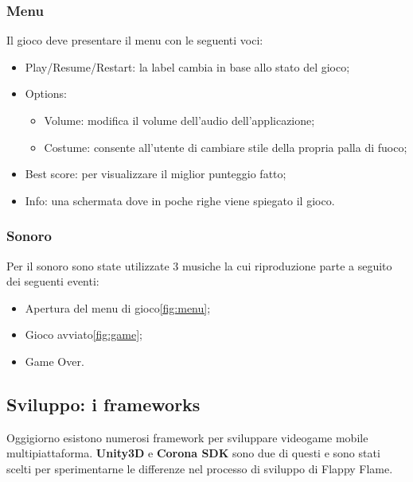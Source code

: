 		\subsubsection{Menu}
			Il gioco deve presentare il menu con le seguenti voci:
			\begin{itemize}
				\item Play/Resume/Restart: la label cambia in base allo stato del gioco;
				\item Options:
				\begin{itemize}
					\item Volume: modifica il volume dell'audio dell'applicazione;
					\item Costume: consente all'utente di cambiare stile della propria palla di fuoco;
				\end{itemize}
				\item Best score: per visualizzare il miglior punteggio fatto;
				\item Info: una schermata dove in poche righe viene spiegato il gioco.
			\end{itemize}
		
		\subsubsection{Sonoro}
			Per il sonoro sono state utilizzate 3 musiche la cui riproduzione parte a seguito dei seguenti eventi:
			\begin{itemize}
				\item Apertura del menu di gioco\ref{fig:menu};
				\item Gioco avviato\ref{fig:game};
				\item Game Over.
			\end{itemize}
	

	
	\subsection{Sviluppo: i frameworks}
		Oggigiorno esistono numerosi framework per sviluppare videogame mobile multipiattaforma. \textbf{Unity3D} e \textbf{Corona SDK} sono due di questi e sono stati scelti per sperimentarne le differenze nel processo di sviluppo di Flappy Flame.
		
